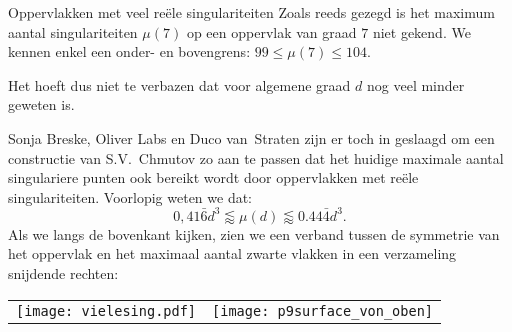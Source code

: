 \begin{surferPage}[216 Singulariteiten]{Oppervlakken met veel re\"ele singulariteiten}
    Zoals reeds gezegd is het maximum aantal singulariteiten
    $\mu(7)$ op een oppervlak van graad $7$ niet gekend.
   We kennen enkel een onder- en bovengrens: $99\leqslant \mu(7) \leqslant 104$. 


    Het hoeft dus niet te verbazen dat voor algemene graad $d$ nog veel minder geweten is. 

    Sonja Breske, Oliver Labs en Duco van~Straten zijn er toch in geslaagd om een constructie van S.V.\ Chmutov zo aan te passen dat het huidige maximale aantal singulariere punten ook bereikt wordt door oppervlakken met re\"ele singulariteiten. 
    Voorlopig weten we dat:
    \[0,41\bar{6}d^3 \lessapprox \mu(d) \lessapprox 0.44\bar{4} d^3.\]
     Als we langs de bovenkant kijken, zien we een verband tussen de symmetrie van het oppervlak en het maximaal aantal zwarte vlakken in een verzameling snijdende rechten:
    \begin{center}
      \begin{tabular}{c@{\qquad}c}
        \texttt{[image: vielesing.pdf]}
        &
        \texttt{[image: p9surface\_von\_oben]}
      \end{tabular}
    \end{center}
\end{surferPage}
